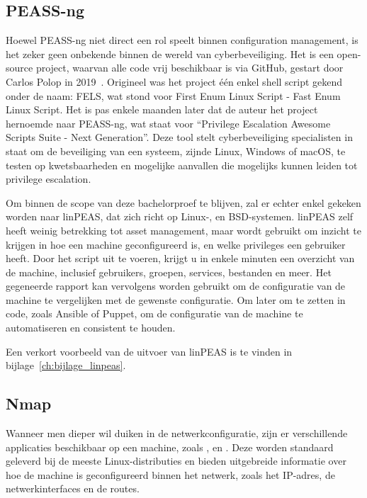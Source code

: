 \subsection{PEASS-ng}
\label{sub:peass-ng}

Hoewel PEASS-ng niet direct een rol speelt binnen configuration management, is het zeker geen onbekende binnen de wereld van cyberbeveiliging.
Het is een open-source project, waarvan alle code vrij beschikbaar is via GitHub, gestart door Carlos Polop in 2019~\autocite{peass-ng-github}.
Origineel was het project \'e\'en enkel shell script gekend onder de naam: FELS, wat stond voor First Enum Linux Script - Fast Enum Linux Script.
Het is pas enkele maanden later dat de auteur het project hernoemde naar PEASS-ng, wat staat voor ``Privilege Escalation Awesome Scripts Suite - Next Generation''.
Deze tool stelt cyberbeveiliging specialisten in staat om de beveiliging van een systeem, zijnde Linux, Windows of macOS, te testen op kwetsbaarheden en mogelijke aanvallen die mogelijks kunnen leiden tot privilege escalation.

Om binnen de scope van deze bachelorproef te blijven, zal er echter enkel gekeken worden naar linPEAS, dat zich richt op Linux-, en BSD-systemen.
linPEAS zelf heeft weinig betrekking tot asset management, maar wordt gebruikt om inzicht te krijgen in hoe een machine geconfigureerd is, en welke privileges een gebruiker heeft.
Door het script uit te voeren, krijgt u in enkele minuten een overzicht van de machine, inclusief gebruikers, groepen, services, bestanden en meer.
Het gegeneerde rapport kan vervolgens worden gebruikt om de configuratie van de machine te vergelijken met de gewenste configuratie.
Om later om te zetten in code, zoals Ansible of Puppet, om de configuratie van de machine te automatiseren en consistent te houden.

Een verkort voorbeeld van de uitvoer van linPEAS is te vinden in bijlage~\ref{ch:bijlage_linpeas}.

\subsection{Nmap}
\label{sub:nmap}

Wanneer men dieper wil duiken in de netwerkconfiguratie, zijn er verschillende applicaties beschikbaar op een machine, zoals ,  en .
Deze worden standaard geleverd bij de meeste Linux-distributies en bieden uitgebreide informatie over hoe de machine is geconfigureerd binnen het netwerk, zoals het IP-adres, de netwerkinterfaces en de routes.

